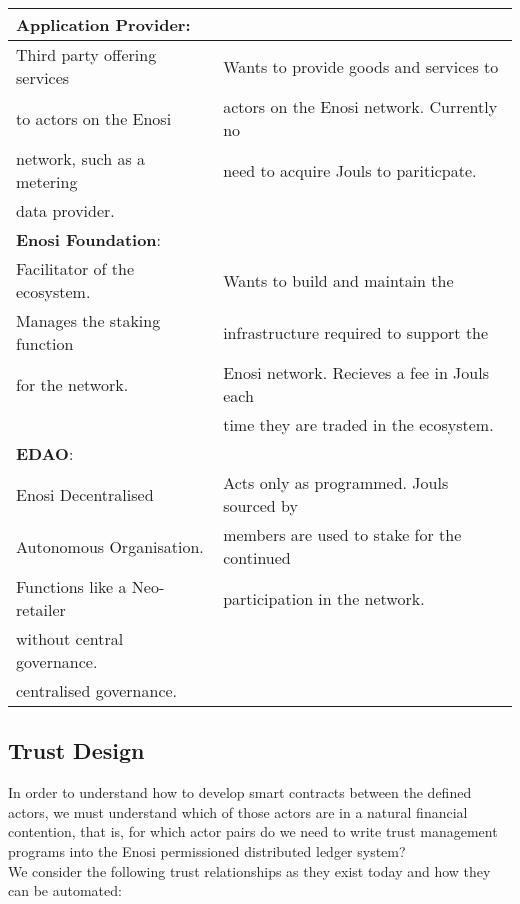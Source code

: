 \documentclass{article}
\theoremstyle{definition}
\theoremstyle{plain} %
\begin{document}
\begin{tabular}{|l|l|}
 \textbf{Application Provider}:	& \\
 \hline 
 Third party offering services	& Wants to provide goods and services to 		\\
 to actors on the Enosi 		& actors on the Enosi network. Currently no 	\\
 network, such as a metering	& need to acquire Jouls to pariticpate.			\\
 data provider.					& \\
 \hline
 
 \textbf{Enosi Foundation}:		& \\
 \hline 
 Facilitator of the ecosystem.	& Wants to build and maintain the 				\\
 Manages the staking function	& infrastructure required to support the 		\\
 for the network.				& Enosi network. Recieves a fee in Jouls each	\\
 								& time they are traded in the ecosystem.		\\
 \hline 

 \textbf{EDAO}:					& \\
 \hline 
 Enosi Decentralised 			& Acts only as programmed. Jouls sourced by		\\
 Autonomous Organisation.		& members are used to stake for the continued	\\
 Functions like a Neo-retailer	& participation in the network. \\
 without central governance. 	& \\
 centralised governance.		& \\
 \hline
\end{tabular}


\subsection{Trust Design}

In order to understand how to develop smart contracts between the defined actors, we must understand which of those actors are in a natural financial contention, that is, for which actor pairs do we need to write trust management programs into the Enosi permissioned distributed ledger system? \\

\noindent We consider the following trust relationships as they exist today and how they can be automated:
\end{document}

